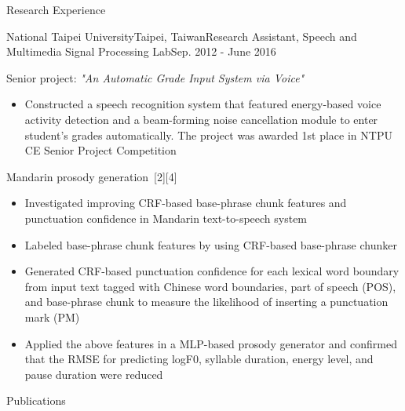 \documentclass{resume} %
\begin{document}
\begin{rSection}{Research Experience}
\begin{rSubsection}{National Taipei University}{Taipei, Taiwan}{Research Assistant, Speech and Multimedia Signal Processing Lab}{Sep. 2012 - June 2016}
        \item Senior project: {\em "An Automatic Grade Input System via Voice"}
        \begin{itemize}[label=$-$]
            \setlength \itemsep{-0.5em}
            \item Constructed a speech recognition system that featured energy-based voice activity detection and a beam-forming noise cancellation module to enter student’s grades automatically. The project was awarded 1st place in NTPU CE Senior Project Competition
        \end{itemize}\vspace{0.5em}
        \item Mandarin prosody generation~[2][4]
        \begin{itemize}[label=$-$]
            \setlength \itemsep{-0.5em}
            \item Investigated improving CRF-based base-phrase chunk features and punctuation confidence in Mandarin text-to-speech system
            \item Labeled base-phrase chunk features by using CRF-based base-phrase chunker
            \item Generated CRF-based punctuation confidence for each lexical word boundary from input text tagged with Chinese word boundaries, 
                  part of speech (POS), and base-phrase chunk to measure the likelihood of inserting a punctuation mark (PM)
            \item Applied the above features in a MLP-based prosody generator and confirmed that the RMSE for predicting logF0, syllable duration, energy level, and pause duration were reduced
        \end{itemize}\vspace{0.5em}
    \end{rSubsection}
\end{rSection}

\begin{rSection}{Publications}
    
    
    \begin{enumerate}[label={[\arabic*]}]
    \item {}
    \item {}
    \item {}
    \item {}
    \end{enumerate}    
\end{rSection}
\end{document}
